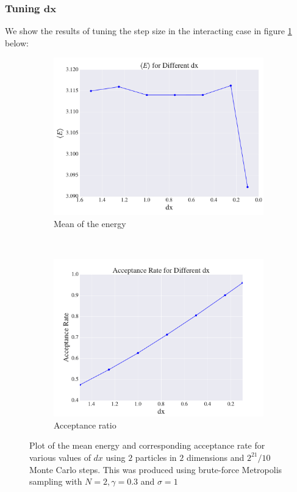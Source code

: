 \documentclass[a4paper, 10pt]{article}
\begin{document}
	 \subsubsection{Tuning $\boldsymbol{dx}$}
	 We show the results of tuning the step size in the interacting case in figure \ref{fig:results_benchmark_no_importance_interacting} below:
	 \begin{figure}[ht!]
	 	\centering
	 	\begin{subfigure}[b]{0.8\textwidth}
	 		\centering
	 		\includegraphics[width=\textwidth]{../Results/E_v_dx_normal_interacting.pdf}
	 		\caption{Mean of the energy}
	 	\end{subfigure}
	 	~
	 	\begin{subfigure}[b]{0.8\textwidth}
	 		\centering
	 		\includegraphics[width=\textwidth]{../Results/AC_normal_interacting.pdf}
	 		\caption{Acceptance ratio}
	 	\end{subfigure}
	 	\caption{Plot of the mean energy and corresponding acceptance rate for various values of $dx$ using $2$ particles in $2$ dimensions and $2^{21}/10$ Monte Carlo steps. This was produced using brute-force Metropolis sampling with $N=2, \gamma=0.3$ and $\sigma=1$}\label{fig:results_benchmark_no_importance_interacting}
	 \end{figure}
\end{document}
